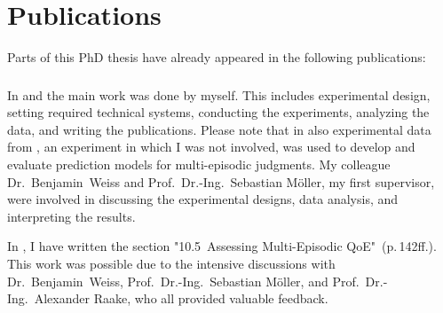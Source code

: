 \chapter*{Publications}
Parts of this PhD thesis have already appeared in the following publications:

\begin{refsection}
    \small
    \nocite{guse_macro-temporal_2013}
    \nocite{guse_modelling_2014}
    \nocite{weiss_temporal_2014}
    \printbibliography[heading=none]
\end{refsection}

\subsection*{}
In \citet{guse_macro-temporal_2013} and \citet{guse_modelling_2014} the main work was done by myself.
This includes experimental design, setting required technical systems, conducting the experiments, analyzing the data, and writing the publications.
Please note that in \citet{guse_modelling_2014} also experimental data from \citet{moller_single-call_2011}, an experiment in which I was not involved, was used to develop and evaluate prediction models for multi-episodic judgments.
My colleague Dr.~Benjamin~Weiss and Prof.~Dr.-Ing.~Sebastian Möller, my first supervisor, were involved in discussing the experimental designs, data analysis, and interpreting the results.

In \citet{weiss_temporal_2014}, I have written the section "10.5~Assessing Multi-Episodic QoE"~(p.\,142ff.).
This work was possible due to the intensive discussions with Dr.~Benjamin~Weiss, Prof.~Dr.-Ing.~Sebastian Möller, and Prof.~Dr.-Ing.~Alexander Raake, who all provided valuable feedback.